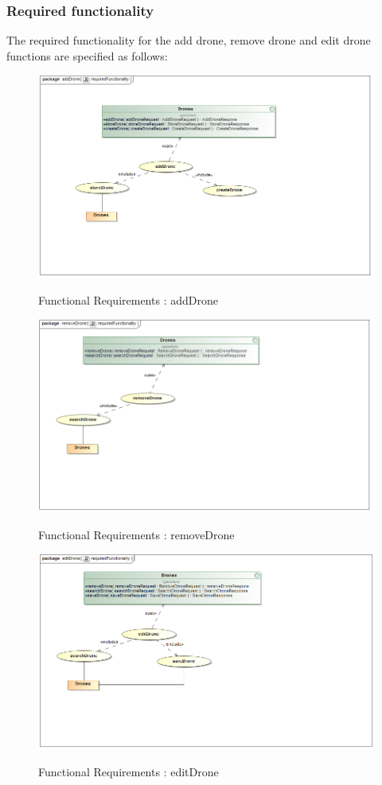 \documentclass{article}
\begin{document}
	\subsubsection{Required functionality}
	The required functionality for the add drone, remove drone and edit drone functions are specified as follows:
		\begin{figure}[H]
			\includegraphics[width=\textwidth]{rf_add.png}  \\
			\caption{Functional Requirements : addDrone}
		\end{figure}
		\begin{figure}[H]
			\includegraphics[width=\textwidth]{rf_remove.png}  \\
			\caption{Functional Requirements : removeDrone}
		\end{figure}
		\begin{figure}[H]
			\includegraphics[width=\textwidth]{rf.png}  \\
			\caption{Functional Requirements : editDrone}
		\end{figure}
	
\end{document}
